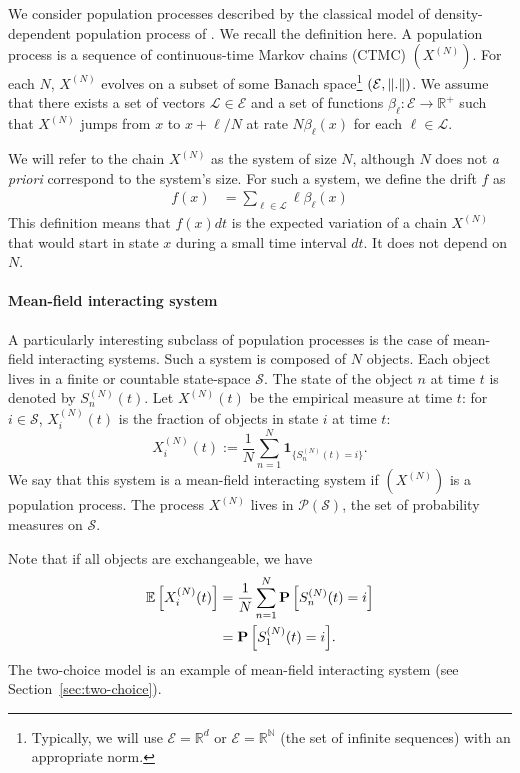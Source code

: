 \documentclass[acmlarge]{acmart}
\newcommand\SN{S^{(N)}}
\newcommand\XN{X^{(N)}}
\newcommand\E{\mathcal{E}}
\newcommand\N{\mathbb{N}}
\newcommand\R{\mathbb{R}}
\newcommand\calL{\mathcal{L}}
\newcommand\calP{\mathcal{P}}
\newcommand\calS{\mathcal{S}}
\newcommand\esp[1]{{\mathchoice{\besp{#1}}{\sesp{#1}}{\sesp{#1}}{\sesp{#1}}}}
\newcommand\besp[1]{\mathbb{E}\left[#1\right]}
\newcommand\sesp[1]{\mathbb{E}[#1]}
\newcommand\Proba[1]{{\mathchoice{\bProba{#1}}{\sProba{#1}}{\sProba{#1}}{\sProba{#1}}}}
\newcommand\bProba[1]{\mathbf{P}\left[#1\right]}
\newcommand\sProba[1]{\mathbf{P}[#1]}
\newcommand\norm[1]{{\mathchoice{\bnorm{#1}}{\snorm{#1}}{\snorm{#1}}{\snorm{#1}}}}
\newcommand\bnorm[1]{\left\|#1\right\|}
\newcommand\snorm[1]{\|#1\|}
\newcommand\Ind[1]{\mathbf{1}_{\{#1\}}}
\begin{document}
We consider population processes described by the classical model of
density-dependent population process of
\cite{kurtz70,kurtz1978strong}. We recall the definition here. A
population process is a sequence of continuous-time Markov chains
(CTMC) $(\XN)$. For each $N$, $\XN$ evolves on a subset of some Banach
space\footnote{Typically, we will use $\E=\R^d$ or $\E=\R^{\N}$ (the
  set of infinite sequences) with an appropriate norm.}
$(\E,\norm{.})$. We assume that there exists a set of vectors
$\calL\in \E$ and a set of functions $\beta_\ell:\E\to\R^+$ such that
$\XN$ jumps from $x$ to $x+\ell/N$ at rate $N \beta_\ell(x)$ for each
$\ell\in\calL$.

We will refer to the chain $\XN$ as the system of size $N$, although
$N$ does not \emph{a priori} correspond to the system's size.  For
such a system, we define the drift $f$ as
\begin{align*}
  f(x) &= \sum_{\ell\in\calL}\ell\beta_\ell(x) 
\end{align*}
This definition means that $f(x)dt$ is the expected variation of a
chain $\XN$ that would start in state $x$ during a small time interval
$dt$. It does not depend on $N$. 



\paragraph*{Mean-field interacting system}
A particularly interesting subclass of population processes is the
case of mean-field interacting systems. Such a system is composed of $N$
objects. Each object lives in a finite or countable state-space
$\calS$. The state of the object $n$ at time $t$ is denoted by
$\SN_n(t)$. Let $\XN(t)$ be the empirical measure at time $t$: for
$i\in\calS$, $\XN_i(t)$ is the fraction of objects in state $i$ at
time $t$:
\begin{equation*}
  \XN_i(t) := \frac{1}{N}\sum_{n=1}^N \Ind{\SN_n(t)=i}.
\end{equation*}
We say that this system is a mean-field interacting system if $(\XN)$
is a population process.  The process $\XN$ lives in $\calP(\calS)$,
the set of probability measures on $\calS$.

Note that if all objects are exchangeable, we have
\begin{align}
  \esp{\XN_i(t)} &= \frac{1}{N} \sum_{n=1}^N \Proba{\SN_n(t)=i}\nonumber\\
  &=\Proba{\SN_1(t)=i}. \label{eq:symmetric}
\end{align}
The two-choice model is an example of mean-field interacting system
(see Section~\ref{sec:two-choice}).
\end{document}
